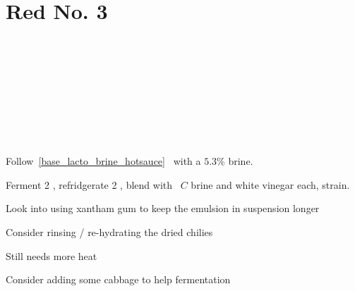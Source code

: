 \section[Red No. 3]{Red No. 3}

\begin{recipestats}[
        servings=12 \fluidounce,
        preptime=1 \hour,
        bakingtime=4 \week,
        source=Teresi Family,
    ]
\end{recipestats}

\begin{ingredientcolumns}[1]
    \begin{ingredientblock}
        \\
        \\
        \\
        \\
    \end{ingredientblock}
    \begin{ingredientblock}
        \\
        \\
        \\
    \end{ingredientblock}
\end{ingredientcolumns}

\begin{preparation}
\item Follow~\ref{base_lacto_brine_hotsauce}~ with a $5.3\%$ brine.

\item Ferment 2 \week, refridgerate 2 \week, blend with \onehalf~$C$ brine and white vinegar each, strain.
\end{preparation}

\begin{experiments}
\item Look into using xantham gum to keep the emulsion in suspension longer
\item Consider rinsing / re-hydrating the dried chilies
\item Still needs more heat
\item Consider adding some cabbage to help fermentation
\end{experiments}

\recipeend%
